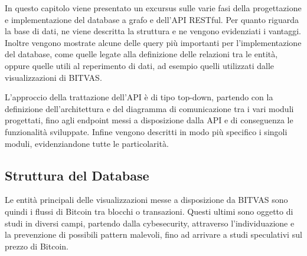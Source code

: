 In questo capitolo viene presentato un excursus sulle varie fasi della progettazione e implementazione del database a grafo e dell'API RESTful. 
Per quanto riguarda la base di dati, ne viene descritta la struttura e ne vengono evidenziati i vantaggi. Inoltre vengono mostrate alcune delle query più importanti per l'implementazione del database, come quelle legate alla definizione delle relazioni tra le entità, oppure quelle utili al reperimento di dati, ad esempio quelli utilizzati dalle visualizzazioni di BITVAS.

L'approccio della trattazione dell'API è di tipo top-down, partendo con la definizione dell'architettura e del diagramma di comunicazione tra i vari moduli progettati, fino agli endpoint messi a disposizione dalla API e di conseguenza le funzionalità sviluppate.
Infine vengono descritti in modo più specifico i singoli moduli, evidenziandone tutte le particolarità.

\subsection{Struttura del Database}

Le entità principali delle visualizzazioni messe a disposizione da BITVAS sono quindi i flussi di Bitcoin tra blocchi o transazioni.
Questi ultimi sono oggetto di studi in diversi campi, partendo dalla cybesecurity, attraverso l'individuazione e la prevenzione di possibili pattern malevoli, fino ad arrivare a studi speculativi sul prezzo di Bitcoin.

